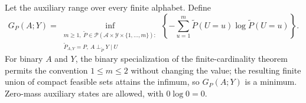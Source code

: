 Let the auxiliary range over every finite alphabet. Define
\[
G_P(A;Y)=\inf_{\substack{m\geq1,\ \widetilde P\in\mathcal P(\mathcal A\times\mathcal Y\times\{1,\ldots,m\}):\\ \widetilde P_{A,Y}=P,\ A\perp_{\widetilde P}Y\mid U}}
\left\{-\sum_{u=1}^m\widetilde P(U=u)\log\widetilde P(U=u)\right\}.
\]
For binary \(A\) and \(Y\), the binary specialization of the finite-cardinality theorem permits the convention \(1\leq m\leq2\) without changing the value; the resulting finite union of compact feasible sets attains the infimum, so \(G_P(A;Y)\) is a minimum. Zero-mass auxiliary states are allowed, with \(0\log0=0\).
